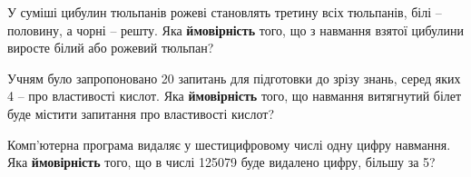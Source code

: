 \documentclass[12pt]{article}
\begin{document}
\begin{samepage}
\noindent\zadnum У суміші цибулин тюльпанів рожеві становлять третину всіх тюльпанів, білі – половину, а чорні – решту. Яка \textbf{ймовірність} того, що з навмання взятої цибулини виросте білий або рожевий тюльпан? 

\nmtnobreak
\nopagebreak\nbvspace{0.3cm}
\par{}
\end{samepage}

\begin{samepage}
\noindent\zadnum Учням було запропоновано 20 запитань для підготовки до зрізу знань, серед яких 4 – про властивості кислот. Яка \textbf{ймовірність} того, що навмання витягнутий білет буде містити запитання про властивості кислот? 

\nmtnobreak
\nopagebreak\nbvspace{0.3cm}
\par{}
\end{samepage}

\begin{samepage}
\noindent\zadnum Комп’ютерна програма видаляє у шестицифровому числі одну цифру навмання. Яка \textbf{ймовірність} того, що в числі 125079 буде видалено цифру, більшу за 5? 

\nmtnobreak
\nopagebreak\nbvspace{0.3cm}
\par{}
\end{samepage}
\end{document}
